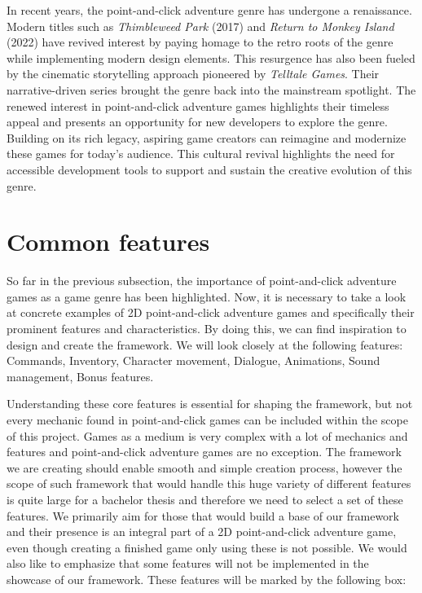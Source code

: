 In recent years, the point-and-click adventure genre has undergone a renaissance. Modern titles such as \textit{Thimbleweed Park} (2017) and \textit{Return to Monkey Island} (2022) have revived interest by paying homage to the retro roots of the genre while implementing modern design elements. This resurgence has also been fueled by the cinematic storytelling approach pioneered by \textit{Telltale Games}. Their narrative-driven series brought the genre back into the mainstream spotlight. The renewed interest in point-and-click adventure games highlights their timeless appeal and presents an opportunity for new developers to explore the genre. Building on its rich legacy, aspiring game creators can reimagine and modernize these games for today's audience. This cultural revival highlights the need for accessible development tools to support and sustain the creative evolution of this genre.

\section{Common features}
\label{sec:Common features}
So far in the previous subsection, the importance of point-and-click adventure games as a game genre has been highlighted. Now, it is necessary to take a look at concrete examples of 2D point-and-click adventure games and specifically their prominent features and characteristics. By doing this, we can find inspiration to design and create the framework. We will look closely at the following features: Commands, Inventory, Character movement, Dialogue, Animations, Sound management, Bonus features.

Understanding these core features is essential for shaping the framework, but not every mechanic found in point-and-click games can be included within the scope of this project. Games as a medium is very complex with a lot of mechanics and features and point-and-click adventure games are no exception. The framework we are creating should enable smooth and simple creation process, however the scope of such framework that would handle this huge variety of different features is quite large for a bachelor thesis and therefore we need to select a set of these features. We primarily aim for those that would build a base of our framework and their presence is an integral part of a 2D point-and-click adventure game, even though creating a finished game only using these is not possible. We would also like to emphasize that some features will not be implemented in the showcase of our framework. These features will be marked by the following box:

